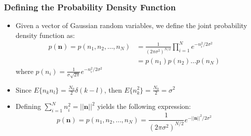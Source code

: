 \documentclass[10pt]{beamer}
\begin{document}
{
  \frametitle{Defining the Probability Density Function}

    \begin{itemize}
        \item Given a vector of Gaussian random variables, we define the joint probability density function as:
        \begin{equation}
        \begin{split}
            p(\mathbf{n})=p(n_1,n_2,\ldots,n_N)&=\frac{1}{(2\pi\sigma^2)^{N/2}}\prod\limits_{i=1}^{N}{e^{-n_i^2/2\sigma^2}}\\
            &=p(n_1)p(n_2)\ldots{p(n_N)}\nonumber
        \end{split}
        \end{equation}
        where $p(n_i)=\frac{1}{\sigma\sqrt{2\pi}}e^{-n_i^2/2\sigma^2}$
        \item Since $E\{n_kn_l\}=\frac{N_0}{2}\delta(k-l)$, then $E\{n_k^2\}=\frac{N_0}{2}=\sigma^2$
        \item Defining $\sum\limits_{i=1}^{N}n_i^2=||\mathbf{n}||^2$ yields the following expression:
        \begin{equation}
            p(\mathbf{n})=p(n_1,n_2,\ldots,n_N)=\frac{1}{(2\pi\sigma^2)^{N/2}}{e^{-||\mathbf{n}||^2/2\sigma^2}}\nonumber
        \end{equation}        
    \end{itemize}

}
\end{document}
